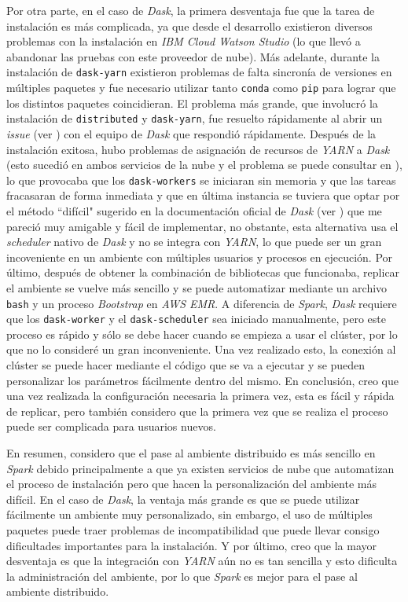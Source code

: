 Por otra parte, en el caso de \textit{Dask}, la primera desventaja fue que la tarea de instalación es más complicada, ya que desde el desarrollo existieron diversos problemas con la instalación en \textit{IBM Cloud Watson Studio} (lo que llevó a abandonar las pruebas con este proveedor de nube). Más adelante, durante la instalación de \texttt{dask-yarn} existieron problemas de falta sincronía de versiones en múltiples paquetes y fue necesario utilizar tanto \texttt{conda} como \texttt{pip} para lograr que los distintos paquetes coincidieran. El problema más grande, que involucró la instalación de \texttt{distributed} y \texttt{dask-yarn}, fue resuelto rápidamente al abrir un \textit{issue} (ver \cite{issue-dask-yarn}) con el equipo de \textit{Dask} que respondió rápidamente. Después de la instalación exitosa, hubo problemas de asignación de recursos de \textit{YARN} a \textit{Dask} (esto sucedió en ambos servicios de la nube y el problema se puede consultar en \cite{q-dask-yarn}), lo que provocaba que los \texttt{dask-workers} se iniciaran sin memoria y que las tareas fracasaran de forma inmediata y que en última instancia se tuviera que optar por el método ``difícil"  sugerido en la documentación oficial de \textit{Dask} (ver \cite{daskdistributedsetup}) que me pareció muy amigable y fácil de implementar, no obstante, esta alternativa usa el \textit{scheduler} nativo de \textit{Dask} y no se integra con \textit{YARN}, lo que puede ser un gran incoveniente en un ambiente con múltiples usuarios y procesos en ejecución. Por último, después de obtener la combinación de bibliotecas que funcionaba, replicar el ambiente se vuelve más sencillo y se puede automatizar mediante un archivo \texttt{bash} y un proceso \textit{Bootstrap} en \textit{AWS EMR}. A diferencia de \textit{Spark}, \textit{Dask} requiere que los \texttt{dask-worker} y el \texttt{dask-scheduler} sea iniciado manualmente, pero este proceso es rápido y sólo se debe hacer cuando se empieza a usar el clúster, por lo que no lo consideré un gran inconveniente. Una vez realizado esto, la conexión al clúster se puede hacer mediante el código que se va a ejecutar y se pueden personalizar los parámetros fácilmente dentro del mismo. En conclusión, creo que una vez realizada la configuración necesaria la primera vez, esta es fácil y rápida de replicar, pero también considero que la primera vez que se realiza el proceso puede ser complicada para usuarios nuevos. 

En resumen, considero que el pase al ambiente distribuido es más sencillo en \textit{Spark} debido principalmente a que ya existen servicios de nube que automatizan el proceso de instalación pero que hacen la personalización del ambiente más difícil. En el caso de \textit{Dask}, la ventaja más grande es que se puede utilizar fácilmente un ambiente muy personalizado, sin embargo, el uso de múltiples paquetes puede traer problemas de incompatibilidad que puede llevar consigo dificultades importantes para la instalación. Y por último, creo que la mayor desventaja es que la integración con \textit{YARN} aún no es tan sencilla y esto dificulta la administración del ambiente, por lo que \textit{Spark} es mejor para el pase al ambiente distribuido. 

